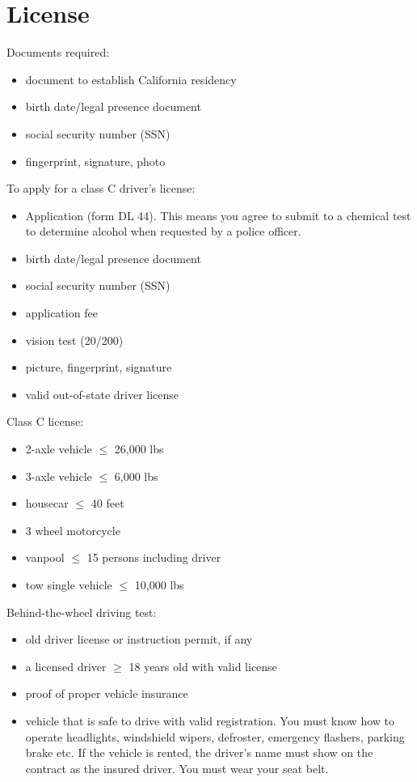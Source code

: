 \section{License}

Documents required:
\begin{itemize}
\item document to establish California residency
\item birth date/legal presence document
\item social security number (SSN)
\item fingerprint, signature, photo
\end{itemize}

To apply for a class C driver's license:
\begin{itemize}
\item Application (form DL 44).
This means you agree to submit to a chemical test to determine alcohol
when requested by a police officer.
\item birth date/legal presence document
\item social security number (SSN)
\item application fee
\item vision test (20/200)
\item picture, fingerprint, signature
\item valid out-of-state driver license
\end{itemize}

Class C license:
\begin{itemize}
\item 2-axle vehicle $\leq$ 26,000 lbs
\item 3-axle vehicle $\leq$ 6,000 lbs
\item housecar $\leq$ 40 feet
\item 3 wheel motorcycle
\item vanpool $\leq$ 15 persons including driver
\item tow single vehicle $\leq$ 10,000 lbs
\end{itemize}

Behind-the-wheel driving test:
\begin{itemize}
\item old driver license or instruction permit, if any
\item a licensed driver $\geq$ 18 years old with valid license
\item proof of proper vehicle insurance
\item vehicle that is safe to drive with valid registration.
You must know how to operate headlights, windshield wipers, defroster,
emergency flashers, parking brake etc.
If the vehicle is rented,
the driver's name must show on the contract as the insured driver.
You must wear your seat belt.
\end{itemize}


